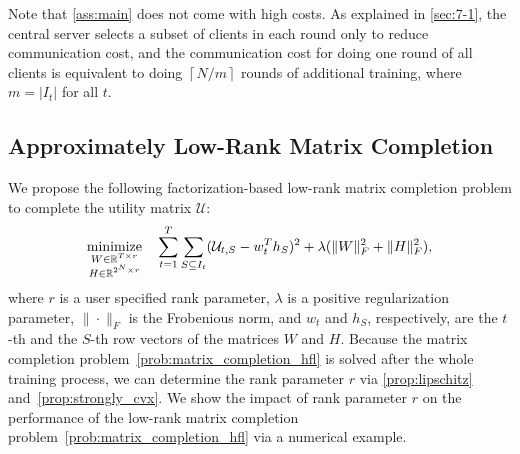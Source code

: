 Note that \autoref{ass:main} does not come with high costs. As explained in \autoref{sec:7-1}, the central server selects a subset of clients in each round only to reduce communication cost, and the communication cost for doing one round of all clients is equivalent to doing $\left \lceil{N / m}\right \rceil $ rounds of additional training, where $m = |I_t|$ for all $t$. 

\subsection{Approximately Low-Rank Matrix Completion} \label{sec:7-6-3}

We propose the following factorization-based low-rank matrix completion problem to complete the utility matrix $\mathcal{U}$: 
\begin{equation}
\label{prob:matrix_completion_hfl}
\displaystyle\mathop{\hbox{\rm minimize}}_{\substack{W \in \mathbb{R}^{T \times r}\\ H \in \mathbb{R}^{2^N \times r}}}\enspace \enspace \sum_{t=1}^T\sum_{S\subseteq I_t} (\mathcal{U}_{t,S} - w_t^Th_{S})^2 + 
\lambda(\|W\|_F^2 + \|H\|_F^2),
\end{equation}
where $r$ is a user specified rank parameter, $\lambda$ is a positive regularization parameter, $\|\cdot\|_F$ is the Frobenious norm, and $w_t$ and $h_S$, respectively, are the $t$-th and the $S$-th row vectors of the matrices $W$ and $H$. Because the matrix completion problem~\eqref{prob:matrix_completion_hfl} is solved after the whole training process, we can determine the rank parameter $r$ via \autoref{prop:lipschitz} and~\autoref{prop:strongly_cvx}. We show the impact of rank parameter $r$ on the performance of the low-rank matrix completion problem~\eqref{prob:matrix_completion_hfl} via a numerical example.

